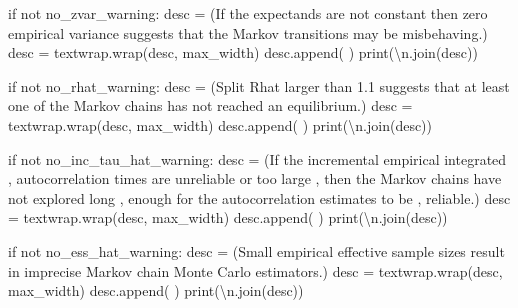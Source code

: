 \documentclass[
  letterpaper,
  DIV=11,
  numbers=noendperiod]{scrartcl}
\newenvironment{Shaded}{\begin{snugshade}}{\end{snugshade}}
\newcommand{\BuiltInTok}[1]{\textcolor[rgb]{0.00,0.23,0.31}{#1}}
\newcommand{\CharTok}[1]{\textcolor[rgb]{0.13,0.47,0.30}{#1}}
\newcommand{\ControlFlowTok}[1]{\textcolor[rgb]{0.00,0.23,0.31}{#1}}
\newcommand{\KeywordTok}[1]{\textcolor[rgb]{0.00,0.23,0.31}{#1}}
\newcommand{\NormalTok}[1]{\textcolor[rgb]{0.00,0.23,0.31}{#1}}
\newcommand{\OperatorTok}[1]{\textcolor[rgb]{0.37,0.37,0.37}{#1}}
\newcommand{\StringTok}[1]{\textcolor[rgb]{0.13,0.47,0.30}{#1}}
\begin{document}
\begin{Shaded}
\begin{Highlighting}[]
  \ControlFlowTok{if} \KeywordTok{not}\NormalTok{ no\_zvar\_warning:}
\NormalTok{    desc }\OperatorTok{=}\NormalTok{ (}\StringTok{\textquotesingle{}If the expectands are not constant then zero empirical \textquotesingle{}}
            \StringTok{\textquotesingle{}variance suggests that the Markov transitions may be \textquotesingle{}}
            \StringTok{\textquotesingle{}misbehaving.\textquotesingle{}}\NormalTok{)}
\NormalTok{    desc }\OperatorTok{=}\NormalTok{ textwrap.wrap(desc, max\_width)}
\NormalTok{    desc.append(}\StringTok{\textquotesingle{} \textquotesingle{}}\NormalTok{)}
    \BuiltInTok{print}\NormalTok{(}\StringTok{\textquotesingle{}}\CharTok{\textbackslash{}n}\StringTok{\textquotesingle{}}\NormalTok{.join(desc))}

  \ControlFlowTok{if} \KeywordTok{not}\NormalTok{ no\_rhat\_warning:}
\NormalTok{    desc }\OperatorTok{=}\NormalTok{ (}\StringTok{\textquotesingle{}Split Rhat larger than 1.1 suggests that at least one of \textquotesingle{}}
            \StringTok{\textquotesingle{}the Markov chains has not reached an equilibrium.\textquotesingle{}}\NormalTok{)}
\NormalTok{    desc }\OperatorTok{=}\NormalTok{ textwrap.wrap(desc, max\_width)}
\NormalTok{    desc.append(}\StringTok{\textquotesingle{} \textquotesingle{}}\NormalTok{)}
    \BuiltInTok{print}\NormalTok{(}\StringTok{\textquotesingle{}}\CharTok{\textbackslash{}n}\StringTok{\textquotesingle{}}\NormalTok{.join(desc))}

  \ControlFlowTok{if} \KeywordTok{not}\NormalTok{ no\_inc\_tau\_hat\_warning:}
\NormalTok{    desc }\OperatorTok{=}\NormalTok{ (}\StringTok{\textquotesingle{}If the incremental empirical integrated \textquotesingle{}}\NormalTok{,}
            \StringTok{\textquotesingle{}autocorrelation times are unreliable or too large \textquotesingle{}}\NormalTok{,}
            \StringTok{\textquotesingle{}then the Markov chains have not explored long \textquotesingle{}}\NormalTok{,}
            \StringTok{\textquotesingle{}enough for the autocorrelation estimates to be \textquotesingle{}}\NormalTok{,}
            \StringTok{\textquotesingle{}reliable.\textquotesingle{}}\NormalTok{)}
\NormalTok{    desc }\OperatorTok{=}\NormalTok{ textwrap.wrap(desc, max\_width)}
\NormalTok{    desc.append(}\StringTok{\textquotesingle{} \textquotesingle{}}\NormalTok{)}
    \BuiltInTok{print}\NormalTok{(}\StringTok{\textquotesingle{}}\CharTok{\textbackslash{}n}\StringTok{\textquotesingle{}}\NormalTok{.join(desc))}

  \ControlFlowTok{if} \KeywordTok{not}\NormalTok{ no\_ess\_hat\_warning:}
\NormalTok{    desc }\OperatorTok{=}\NormalTok{ (}\StringTok{\textquotesingle{}Small empirical effective sample sizes result in \textquotesingle{}}
            \StringTok{\textquotesingle{}imprecise Markov chain Monte Carlo estimators.\textquotesingle{}}\NormalTok{)}
\NormalTok{    desc }\OperatorTok{=}\NormalTok{ textwrap.wrap(desc, max\_width)}
\NormalTok{    desc.append(}\StringTok{\textquotesingle{} \textquotesingle{}}\NormalTok{)}
    \BuiltInTok{print}\NormalTok{(}\StringTok{\textquotesingle{}}\CharTok{\textbackslash{}n}\StringTok{\textquotesingle{}}\NormalTok{.join(desc))}


\end{Highlighting}
\end{Shaded}
\end{document}
